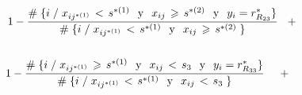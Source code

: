 \documentclass[
  11pt,
  a4paper,
]{article}
\begin{document}
\begin{gather*}
\hspace{0.4cm} 1 -  \dfrac{\# \hspace{0.1 cm}\lbrace i \hspace{0.1 cm}/\hspace{0.1 cm}  x_{ij^{*(1)}} \hspace{0.05cm}   < \hspace{0.05cm} s^{*(1)} \hspace{0.25 cm}\text{y}\hspace{0.25 cm} x_{ij} \hspace{0.05cm}   \geqslant \hspace{0.05cm} s^{*(2)} \hspace{0.25 cm}\text{y}\hspace{0.25 cm} y_i = r^*_{R_{23}} \rbrace}{\# \hspace{0.1 cm}\lbrace i \hspace{0.1 cm} / \hspace{0.1 cm}  x_{ij^{*(1)}} \hspace{0.05cm}   < \hspace{0.05cm} s^{*(1)} \hspace{0.25 cm}\text{y}\hspace{0.25 cm} x_{ij} \hspace{0.05cm}   \geqslant \hspace{0.05cm} s^{*(2)}  \hspace{0.1 cm} \rbrace } \hspace{0.3cm} +    \hspace{0.1cm}  \\ \\
1 -  \dfrac{\# \hspace{0.1 cm}\lbrace i \hspace{0.1 cm}/\hspace{0.1 cm}  x_{ij^{*(1)}} \hspace{0.05cm}   \geqslant \hspace{0.05cm} s^{*(1)} \hspace{0.25 cm}\text{y}\hspace{0.25 cm} x_{ij} \hspace{0.05cm}  < \hspace{0.05cm} s_3 \hspace{0.25 cm}\text{y}\hspace{0.25 cm} y_i = r^*_{R_{33}} \rbrace}{\# \hspace{0.1 cm}\lbrace i \hspace{0.1 cm} / \hspace{0.1 cm}  x_{ij^{*(1)}} \hspace{0.05cm}   < \hspace{0.05cm} s^{*(1)} \hspace{0.25 cm}\text{y}\hspace{0.25 cm} x_{ij} \hspace{0.05cm}   < \hspace{0.05cm} s_3  \hspace{0.1 cm} \rbrace }  \hspace{0.2cm}   \hspace{0.3cm} +    \\ \\ 

\end{gather*}
\end{document}
